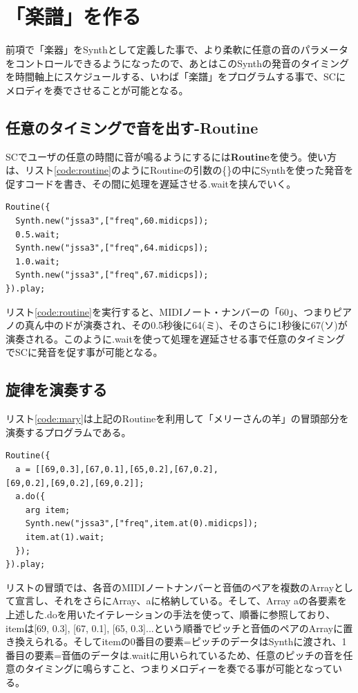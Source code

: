 \documentclass{jsarticle}
\begin{document}
\section{「楽譜」を作る}
前項で「楽器」をSynthとして定義した事で、より柔軟に任意の音のパラメータをコントロールできるようになったので、あとはこのSynthの発音のタイミングを時間軸上にスケジュールする、いわば「楽譜」をプログラムする事で、SCにメロディを奏でさせることが可能となる。

\subsection{任意のタイミングで音を出す-Routine}
SCでユーザの任意の時間に音が鳴るようにするには{\bf Routine}を使う。使い方は、リスト\ref{code:routine}のようにRoutineの引数の\{\}の中にSynthを使った発音を促すコードを書き、その間に処理を遅延させる.waitを挟んでいく。

\begin{lstlisting}[caption=Routineの使用,label=code:routine]
Routine({
  Synth.new("jssa3",["freq",60.midicps]);
  0.5.wait;
  Synth.new("jssa3",["freq",64.midicps]);
  1.0.wait;
  Synth.new("jssa3",["freq",67.midicps]);
}).play;
\end{lstlisting}

リスト\ref{code:routine}を実行すると、MIDIノート・ナンバーの「60」、つまりピアノの真ん中のドが演奏され、その0.5秒後に64(ミ)、そのさらに1秒後に67(ソ)が演奏される。このように.waitを使って処理を遅延させる事で任意のタイミングでSCに発音を促す事が可能となる。

\subsection{旋律を演奏する}
リスト\ref{code:mary}は上記のRoutineを利用して「メリーさんの羊」の冒頭部分を演奏するプログラムである。

\begin{lstlisting}[caption=メリーさんの羊,label=code:mary]
Routine({
  a = [[69,0.3],[67,0.1],[65,0.2],[67,0.2],
[69,0.2],[69,0.2],[69,0.2]];
  a.do({
    arg item;
    Synth.new("jssa3",["freq",item.at(0).midicps]);
    item.at(1).wait;
  });
}).play;
\end{lstlisting}

リストの冒頭では、各音のMIDIノートナンバーと音価のペアを複数のArrayとして宣言し、それをさらにArray、aに格納している。そして、Array aの各要素を上述した.doを用いたイテレーションの手法を使って、順番に参照しており、itemは[69, 0.3], [67, 0.1], [65, 0.3]...という順番でピッチと音価のペアのArrayに置き換えられる。そしてitemの0番目の要素=ピッチのデータはSynthに渡され、1番目の要素=音価のデータは.waitに用いられているため、任意のピッチの音を任意のタイミングに鳴らすこと、つまりメロディーを奏でる事が可能となっている。
\end{document}
